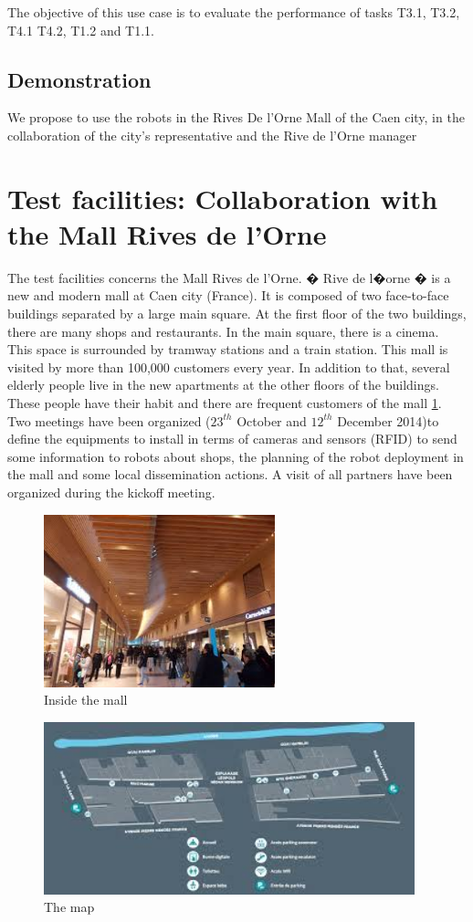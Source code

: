 The objective of this use case is to evaluate the performance of tasks T3.1, T3.2, T4.1 T4.2, T1.2 and T1.1.

\subsection {Demonstration}
We propose to use the robots in the Rives De l'Orne Mall of the Caen city, in the collaboration of the city's representative and the Rive de l'Orne manager
\newpage
\section{Test facilities: Collaboration with the Mall Rives de l'Orne}
The test facilities concerns the Mall Rives de l'Orne. � Rive de l�orne � is a new and modern mall at Caen city (France). It is composed of two face-to-face buildings separated by a large main square. At the first floor of the two buildings, there are many shops and restaurants. In the main square, there is a cinema. This space is surrounded by tramway stations and a train station. This mall is visited by more than 100,000 customers every year. In addition to that, several elderly people live in the new apartments at the other floors of the buildings. These people have their habit and there are frequent customers of the mall \ref{mall}. Two meetings have been organized ($23^{th}$ October and $12^{th}$ December 2014)to define the equipments to install in terms of cameras and sensors (RFID) to send some information to robots about shops, the planning of the robot deployment in the mall and some local dissemination actions. A visit of all partners have been organized during the kickoff meeting. 

\begin{figure}[htbp]
\begin{center}
\includegraphics[height=5cm]{InsideRivedelOrne}
\caption{Inside the mall}
\label{mall}
\end{center}
\end{figure}

\begin{figure}[htbp]
\begin{center}
\includegraphics[height=5cm]{MapsRorne}
\caption{The map}
\label{default}
\end{center}
\end{figure}

